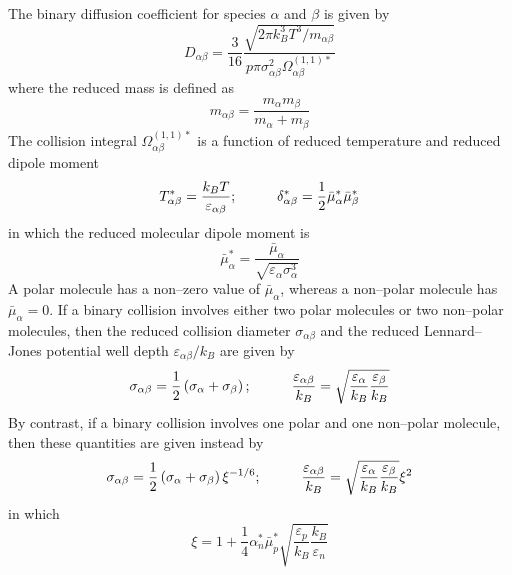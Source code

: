 \documentclass[dvips]{article}
\begin{document}
\noindent
The binary diffusion coefficient for species $\alpha$ and $\beta$ is
given by \cite{HCB}
\begin{equation}    
D_{\alpha\beta} = \frac{3}{16}\frac{\sqrt{2\pi k_{B}^{3}T^{3}/m_{\alpha\beta}}}
{p\pi\sigma_{\alpha\beta}^{2}\Omega_{\alpha\beta}^{(1,1)*}}
\label{SPECDIF}
\end{equation}
where the reduced mass is defined as
\begin{equation}
m_{\alpha\beta} = \frac{m_{\alpha}m_{\beta}}{m_{\alpha}+m_{\beta}}
\end{equation}
The collision integral $\Omega_{\alpha\beta}^{(1,1)*}$ is a function
of reduced temperature and reduced dipole moment
\begin{equation}   
T_{\alpha\beta}^{*} = \frac{k_{B}T}{\varepsilon_{\alpha\beta}};\hspace{10mm}
\delta_{\alpha\beta}^{*} = \frac{1}{2}
\bar{\mu}_{\alpha}^{*}
\bar{\mu}_{\beta}^{*}
\label{REDTEMPDIPMOM}
\end{equation}   
in which the reduced molecular dipole moment is
\begin{equation}   
\bar{\mu}_{\alpha}^{*} = \frac{\bar{\mu}_{\alpha}}
{\sqrt{\varepsilon_{\alpha}\sigma_{\alpha}^{3}}}
\end{equation}
A polar molecule has a non--zero value of $\bar{\mu}_{\alpha}$, whereas
a non--polar molecule has $\bar{\mu}_{\alpha} = 0$.  If a binary collision
involves either two polar molecules or two non--polar molecules, then 
the reduced collision diameter $\sigma_{\alpha\beta}$ and the reduced
Lennard--Jones potential well depth $\varepsilon_{\alpha\beta}/k_{B}$
are given by
\begin{equation}   
\sigma_{\alpha\beta} = \frac{1}{2}\left(\sigma_{\alpha}+\sigma_{\beta}\right)
;\hspace{10mm}
\frac{\varepsilon_{\alpha\beta}}{k_{B}}
= \sqrt{\frac{\varepsilon_{\alpha}}{k_{B}}\frac{\varepsilon_{\beta}}{k_{B}}}
\end{equation}   
By contrast, if a binary collision involves one polar and one non--polar
molecule, then these quantities are given instead by 
\begin{equation}   
\sigma_{\alpha\beta} = \frac{1}{2}\left(\sigma_{\alpha}+\sigma_{\beta}\right)
\xi^{-1/6};\hspace{10mm}
\frac{\varepsilon_{\alpha\beta}}{k_{B}}
= \sqrt{\frac{\varepsilon_{\alpha}}{k_{B}}\frac{\varepsilon_{\beta}}{k_{B}}}
\xi^{2}
\end{equation}   
in which
\begin{equation}
\xi = 1 + \frac{1}{4}\alpha_{n}^{*}\bar{\mu}_{p}^{*}
\sqrt{\frac{\varepsilon_{p}}{k_{B}}\frac{k_{B}}{\varepsilon_{n}}}
\end{equation}
\end{document}
